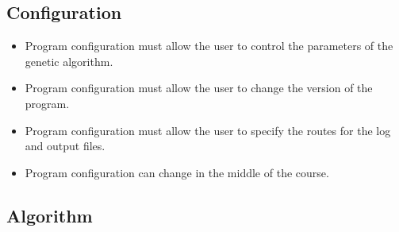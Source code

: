 \subsection{Configuration}

\begin{itemize}
    \item Program configuration must allow the user to control the parameters of the genetic algorithm.
    \item Program configuration must allow the user to change the version of the program.
    \item Program configuration must allow the user to specify the routes for the log and output files.
    \item Program configuration can change in the middle of the course.
\end{itemize}

\subsection{Algorithm}

